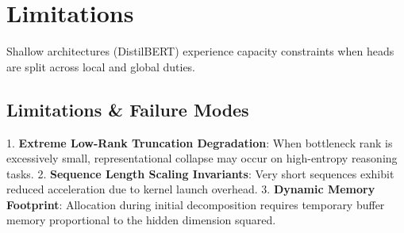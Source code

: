 \section{Limitations}Shallow architectures (DistilBERT) experience capacity constraints when heads are split across local and global duties.



\subsection{Limitations \& Failure Modes}
1. \textbf{Extreme Low-Rank Truncation Degradation}: When bottleneck rank is excessively small, representational collapse may occur on high-entropy reasoning tasks.
2. \textbf{Sequence Length Scaling Invariants}: Very short sequences exhibit reduced acceleration due to kernel launch overhead.
3. \textbf{Dynamic Memory Footprint}: Allocation during initial decomposition requires temporary buffer memory proportional to the hidden dimension squared.